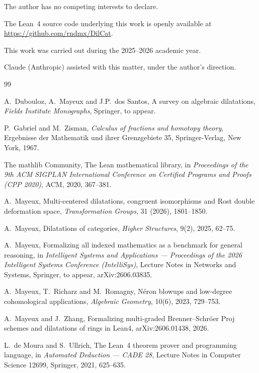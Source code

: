 \documentclass[11pt]{amsart}
\theoremstyle{plain}
\theoremstyle{definition}
\theoremstyle{remark}
\begin{document}
\medskip{}

\smallskip{} The author has no competing interests
to declare.

\smallskip{} The Lean~4 source code underlying this
work is openly available at \url{https://github.com/rndmx/DilCat}.

\smallskip\noindent This work was carried out during the 2025--2026 academic year.

\medskip{}
Claude (Anthropic) assisted with this matter, under the author's direction.

\begin{thebibliography}{99}

 A.~Dubouloz, A.~Mayeux and
  J.P.~dos Santos, A survey on algebraic dilatations, {\it Fields Institute Monographs},
  Springer, to appear.

 P.~Gabriel and M.~Zisman, {\it Calculus of fractions
  and homotopy theory}, Ergebnisse der Mathematik und ihrer Grenzgebiete 35, Springer-Verlag,
  New York, 1967.

 The mathlib Community, The Lean mathematical
  library, in {\it Proceedings of the 9th ACM SIGPLAN International Conference on Certified
  Programs and Proofs (CPP 2020)}, ACM, 2020, 367--381.

 A.~Mayeux, Multi-centered dilatations, congruent isomorphisms and
  Rost double deformation space, {\it Transformation Groups}, 31 (2026), 1801--1850.

 A.~Mayeux, Dilatations of categories, {\it Higher Structures},
  9(2), 2025, 62--75.

 A.~Mayeux, Formalizing all indexed mathematics as a
  benchmark for general reasoning, in {\it Intelligent Systems and Applications ---
  Proceedings of the 2026 Intelligent Systems Conference (IntelliSys)}, Lecture Notes in
  Networks and Systems, Springer, to appear, arXiv:2606.03835.

 A.~Mayeux, T.~Richarz and M.~Romagny,
  N\'eron blowups and low-degree cohomological applications, {\it Algebraic Geometry},
  10(6), 2023, 729--753.

 A.~Mayeux and J.~Zhang, Formalizing multi-graded
  Brenner--Schr\"oer Proj schemes and dilatations of rings in Lean4, arXiv:2606.01438,
  2026.

 L.~de Moura and S.~Ullrich, The Lean~4 theorem
  prover and programming language, in {\it Automated Deduction --- CADE 28}, Lecture Notes
  in Computer Science 12699, Springer, 2021, 625--635.

\end{thebibliography}
\end{document}
